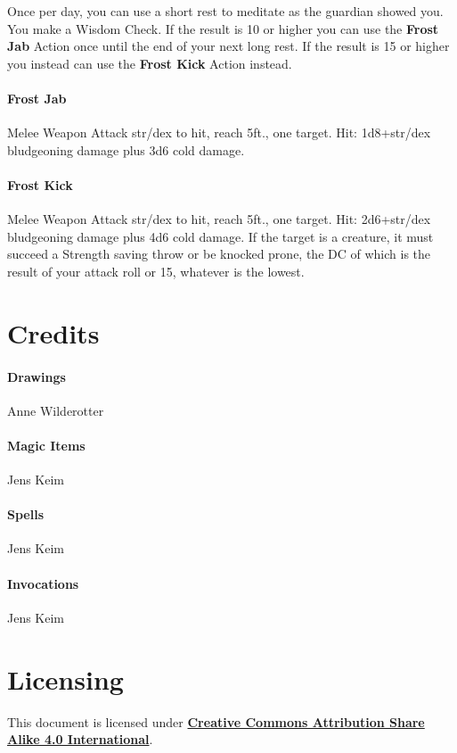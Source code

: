 \documentclass[letter,10pt,twocolumn,openany]{dndbook}
\begin{document}
Once per day, you can use a short rest to meditate as the guardian showed you. You make a Wisdom Check. If the result is 10 or higher you can use the \textbf{Frost Jab} Action once until the end of your next long rest. If the result is 15 or higher you instead can use the \textbf{Frost Kick} Action instead.

\paragraph{Frost Jab} Melee Weapon Attack str/dex to hit, reach 5ft., one target. Hit: 1d8+str/dex bludgeoning damage plus 3d6 cold damage.

\paragraph{Frost Kick} Melee Weapon Attack str/dex to hit, reach 5ft., one target. Hit: 2d6+str/dex bludgeoning damage plus 4d6 cold damage. If the target is a creature, it must succeed a Strength saving throw or be knocked prone, the DC of which is the result of your attack roll or 15, whatever is the lowest.

\backmatter

\section{Credits}

\paragraph{Drawings} Anne Wilderotter
\paragraph{Magic Items} Jens Keim
\paragraph{Spells} Jens Keim
\paragraph{Invocations} Jens Keim

\section{Licensing}

This document is licensed under \href{https://creativecommons.org/licenses/by-sa/4.0/legalcode}{\textbf{Creative Commons Attribution Share Alike 4.0 International}}.
\end{document}
